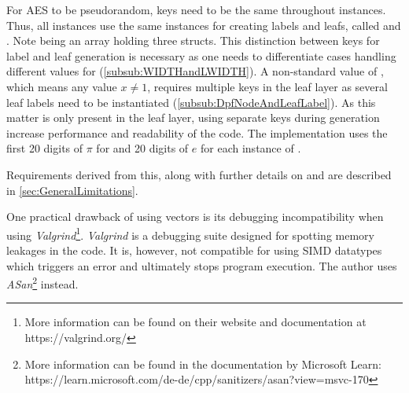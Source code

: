 For AES to be pseudorandom, keys need to be the same throughout instances.
Thus, all instances use the same  instances for creating labels and leafs, called  and .
Note  being an array holding three  structs.
This distinction between keys for label and leaf generation is necessary as one needs to differentiate cases handling different values for  (\ref{subsub:WIDTHandLWIDTH}).
A non-standard value of , which means any value $x\neq1$, requires multiple keys in the leaf layer as several leaf labels need to be instantiated (\ref{subsub:DpfNodeAndLeafLabel}).
As this matter is only present in the leaf layer, using separate keys during generation increase performance and readability of the code.
The implementation uses the first 20 digits of $\pi$ for  and 20 digits of $e$ for each instance of .

Requirements derived from this, along with further details on  and  are described in \ref{sec:GeneralLimitations}.

One practical drawback of using  vectors is its debugging incompatibility when using \textit{Valgrind}\footnote{More information can be found on their website and documentation at https://valgrind.org/}.
\textit{Valgrind} is a debugging suite designed for spotting memory leakages in the code.
It is, however, not compatible for using SIMD datatypes which triggers an error and ultimately stops program execution.
The author uses \textit{ASan}\footnote{More information can be found in the documentation by Microsoft Learn: https://learn.microsoft.com/de-de/cpp/sanitizers/asan?view=msvc-170} instead.

